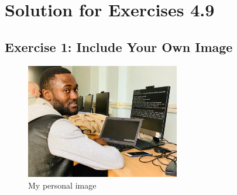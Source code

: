 \documentclass{article}
\begin{document}
\section*{Solution for Exercises 4.9}
\subsection*{Exercise 1: Include Your Own Image}
\begin{figure}[ht]
\centering
\includegraphics[width=0.6\textwidth]{siriki.jpeg}
\caption{My personal image}
\label{fig:myimage}
\end{figure}
\end{document}
